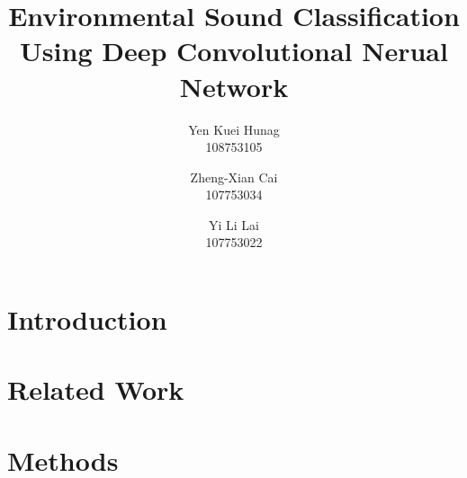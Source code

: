 \documentclass[11pt,oneside,a4paper]{article}
\title{ \LARGE \bf
Environmental Sound Classification Using Deep Convolutional Nerual Network
}
\author{Yen Kuei Hunag \\ 108753105 \and  Zheng-Xian Cai \\ 107753034 \and Yi Li Lai \\ 107753022}
\date{\vspace{-5ex}}
\begin{document}
\maketitle

\begin{abstract}
    
\end{abstract}
\section{Introduction}
    
\section{Related Work}
    
\section{Methods}
    
\begin{comment}
\section{Reference}
    
\end{comment}
\end{document}
